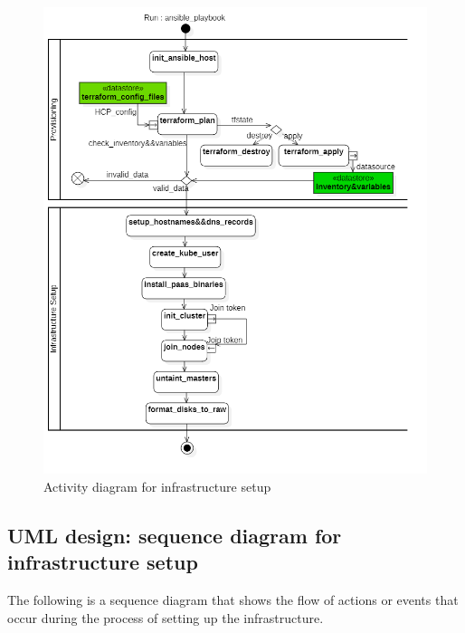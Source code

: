 \begin{figure}[H]\centering
\includegraphics[width=1.0\textwidth,angle=00]{assets/f20.png}
\caption{Activity diagram for infrastructure setup}
\label{fig:activity diagram for infrastructure setup}
\end{figure}


\subsection{UML design: sequence diagram for infrastructure setup}

The following is a sequence diagram that shows the flow of actions or events that occur during the process of setting up the infrastructure.


